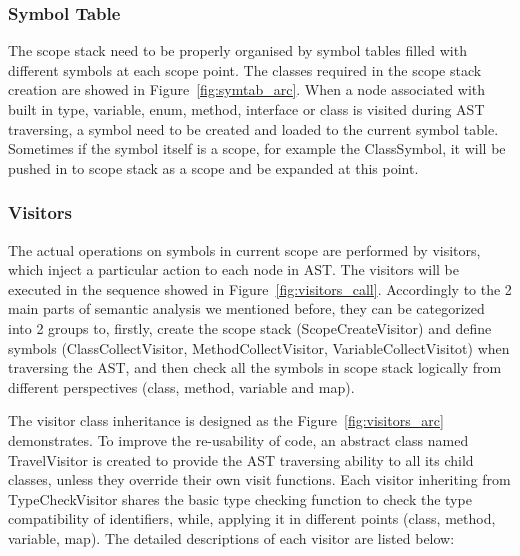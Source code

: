 	\subsubsection{Symbol Table}
	
	
	The scope stack need to be properly organised by symbol tables filled with different symbols at each scope point. The classes required in the scope stack creation are showed in Figure~\ref{fig:symtab_arc}. When a node associated with built in type, variable, enum, method, interface or class is visited during AST traversing, a symbol need to be created and loaded to the current symbol table. Sometimes if the symbol itself is a scope, for example the ClassSymbol, it will be pushed in to scope stack as a scope and be expanded at this point. 
	
	\subsubsection{Visitors}
	
	
	The actual operations on symbols in current scope are performed by visitors, which inject a particular action to each node in AST. The visitors will be executed in the sequence showed in Figure~\ref{fig:visitors_call}. Accordingly to the 2 main parts of semantic analysis we mentioned before, they can be categorized into 2 groups to, firstly, create the scope stack (ScopeCreateVisitor) and define symbols (ClassCollectVisitor, MethodCollectVisitor, VariableCollectVisitot) when traversing the AST, and then check all the symbols in scope stack logically from different perspectives (class, method, variable and map).
	
	
	The visitor class inheritance is designed as the Figure~\ref{fig:visitors_arc} demonstrates. To improve the re-usability of code, an abstract class named TravelVisitor is created to provide the AST traversing ability to all its child classes, unless they override their own visit functions. Each visitor inheriting from TypeCheckVisitor shares the basic type checking function to check the type compatibility of identifiers, while, applying it in different points (class, method, variable, map). The detailed descriptions of each visitor are listed below:
	
